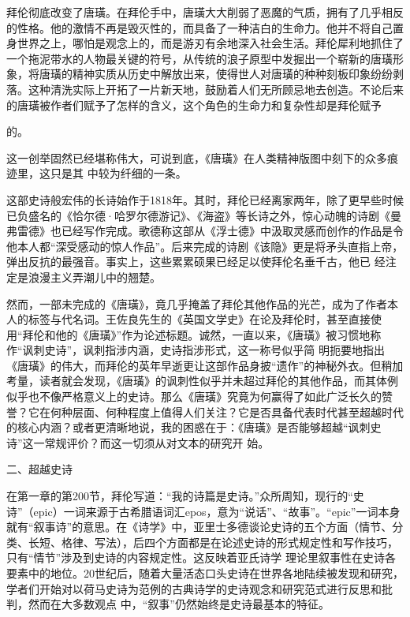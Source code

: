 \documentclass{article}
\begin{document}
拜伦彻底改变了唐璜。在拜伦手中，唐璜大大削弱了恶魔的气质，拥有了几乎相反的性格。他的激情不再是毁灭性的，而具备了一种洁白的生命力。他并不将自己置身世界之上，哪怕是观念上的，而是游刃有余地深入社会生活。拜伦犀利地抓住了一个拖泥带水的人物最关键的符号，从传统的浪子原型中发掘出一个崭新的唐璜形象，将唐璜的精神实质从历史中解放出来，使得世人对唐璜的种种刻板印象纷纷剥落。这种清洗实际上开拓了一片新天地，鼓励着人们无所顾忌地去创造。不论后来的唐璜被作者们赋予了怎样的含义，这个角色的生命力和复杂性却是拜伦赋予

\newpage
的。 

这一创举固然已经堪称伟大，可说到底，《唐璜》在人类精神版图中刻下的众多痕迹里，这只是其
中较为纤细的一条。 

这部史诗般宏伟的长诗始作于1818年。其时，拜伦已经离家两年，除了更早些时候已负盛名的《恰尔德·哈罗尔德游记》、《海盗》等长诗之外，惊心动魄的诗剧《曼弗雷德》也已经写作完成。歌德称这部从《浮士德》中汲取灵感而创作的作品是令他本人都“深受感动的惊人作品”。后来完成的诗剧《该隐》更是将矛头直指上帝，弹出反抗的最强音。事实上，这些累累硕果已经足以使拜伦名垂千古，他已
经注定是浪漫主义弄潮儿中的翘楚。 

然而，一部未完成的《唐璜》，竟几乎掩盖了拜伦其他作品的光芒，成为了作者本人的标签与代名词。王佐良先生的《英国文学史》在论及拜伦时，甚至直接使用“拜伦和他的《唐璜》”作为论述标题。诚然，一直以来，《唐璜》被习惯地称作“讽刺史诗”，讽刺指涉内涵，史诗指涉形式，这一称号似乎简
\newpage
明扼要地指出《唐璜》的伟大，而拜伦的英年早逝更让这部作品身披“遗作”的神秘外衣。但稍加考量，读者就会发现，《唐璜》的讽刺性似乎并未超过拜伦的其他作品，而其体例似乎也不像严格意义上的史诗。那么《唐璜》究竟为何赢得了如此广泛长久的赞誉？它在何种层面、何种程度上值得人们关注？它是否具备代表时代甚至超越时代的核心内涵？或者更清晰地说，我的困惑在于：《唐璜》是否能够超越“讽刺史诗”这一常规评价？而这一切须从对文本的研究开
始。 


二、超越史诗 

在第一章的第200节，拜伦写道：“我的诗篇是史诗。”众所周知，现行的“史诗”（epic）一词来源于古希腊语词汇epos，意为“说话”、“故事”。“epic”一词本身就有“叙事诗”的意思。在《诗学》中，亚里士多德谈论史诗的五个方面（情节、分类、长短、格律、写法），后四个方面都是在论述史诗的形式规定性和写作技巧，只有“情节”涉及到史诗的内容规定性。这反映着亚氏诗学
\newpage
理论里叙事性在史诗各要素中的地位。20世纪后，随着大量活态口头史诗在世界各地陆续被发现和研究，学者们开始对以荷马史诗为范例的古典诗学的史诗观念和研究范式进行反思和批判，然而在大多数观点
中，“叙事”仍然始终是史诗最基本的特征。 
\end{document}
